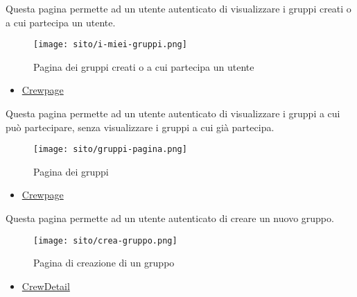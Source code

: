 \label{par:Gruppi dell'utente}
Questa pagina permette ad un utente autenticato di visualizzare i gruppi creati o a cui partecipa un utente. 
\begin{figure}[H] 
    \centering 
    \texttt{[image: sito/i-miei-gruppi.png]} 
    \caption{Pagina dei gruppi creati o a cui partecipa un utente}
\end{figure}
\begin{itemize}
    \item \hyperref[par:Crewpage]{Crewpage}
\end{itemize}


\label{par:Gruppi}
Questa pagina permette ad un utente autenticato di visualizzare i gruppi a cui può partecipare, senza visualizzare i gruppi a cui già partecipa. 
\begin{figure}[H] 
    \centering 
    \texttt{[image: sito/gruppi-pagina.png]} 
    \caption{Pagina dei gruppi}
\end{figure}
\begin{itemize}
    \item \hyperref[par:Crewpage]{Crewpage}
\end{itemize}

\label{par:Crea nuovo gruppo}

Questa pagina permette ad un utente autenticato di creare un nuovo gruppo. 
\begin{figure}[H] 
    \centerline{\texttt{[image: sito/crea-gruppo.png]}}     
    \caption{Pagina di creazione di un gruppo}
\end{figure}
\begin{itemize}
    \item \hyperref[par:CrewDetail]{CrewDetail}
\end{itemize}

